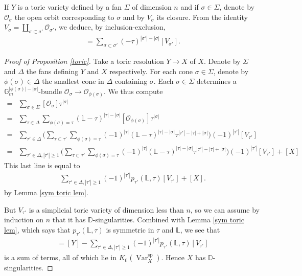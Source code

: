 \documentclass{amsart}
\theoremstyle{definition}
\DeclareMathOperator{\Var}{Var}
\DeclareMathOperator{\spr}{sp}
\newcommand{\KsprX}{K_0(\Var_X^{\spr})}
\numberwithin{equation}{section}
\begin{document}
If $Y$ is a toric variety defined by a fan $\Sigma$ of dimension $n$ and if $\sigma \in \Sigma$, denote by $\mathscr{O}_\sigma$ the open orbit corresponding to $\sigma$ and by $V_\sigma$ its closure. From the identity $V_\sigma = \coprod_{\sigma \subset \sigma'} \mathscr{O}_{\sigma'}$, we deduce, by inclusion-exclusion,
\begin{align*}
    [\mathcal{O}_\sigma] = \sum_{\sigma \subset \sigma'} (-\tau)^{|\sigma'|-|\sigma|} [V_{\sigma'}].
\end{align*}

\begin{proof}[Proof of Proposition \ref{toric}]
Take a toric resolution $Y \rightarrow X$ of $X$. Denote by $\Sigma$ and $\Delta$ the fans defining $Y$ and $X$ respectively. For each cone $\sigma \in \Sigma$, denote by $\phi(\sigma) \in \Delta$ the smallest cone in $\Delta$ containing $\sigma$. Each $\sigma \in \Sigma$ determines a $\mathbb{G}_m^{|\phi(\sigma)|-|\sigma|}$-bundle $\mathcal{O}_\sigma \rightarrow \mathcal{O}_{\phi(\sigma)}$. We thus compute
\begin{align*}
    [Y] =& \sum_{\sigma \in \Sigma} [\mathcal{O}_\sigma] \tau^{|\sigma|} \\
        =& \sum_{\tau \in \Delta} \sum_{\phi(\sigma) = \tau} (\mathbb{L}-\tau)^{|\tau|-|\sigma|} [\mathcal{O}_{\phi(\sigma)}] \tau^{|\sigma|} \\
        =& \sum_{\tau' \in \Delta} \bigg( \sum_{\tau \subset \tau'} \sum_{\phi(\sigma) = \tau } (-1)^{|\tau|} (\mathbb{L}-\tau)^{|\tau|-|\sigma|} \tau^{|\tau'|-|\tau|+|\sigma|} \bigg) (-1)^{|\tau'|} [V_{\tau '}] \\
        =& \sum_{\tau' \in \Delta, |\tau'| \geq 1} \bigg( \sum_{\tau \subset \tau'} \sum_{\phi(\sigma) = \tau} (-1)^{|\tau|} (\mathbb{L}-\tau)^{|\tau|-|\sigma|}  \tau^{|\tau'|-|\tau|+|\sigma|} \bigg) (-1)^{|\tau'|} [V_{\tau'}] + [X] 
\end{align*}
This last line is equal to 
\begin{align*}
    \sum_{\tau' \in \Delta, |\tau'| \geq 1} (-1)^{|\tau'|} p_{\tau'}(\mathbb{L}, \tau) [V_{\tau'}] + [X].
\end{align*}
by Lemma \ref{sym toric lem}.

But $V_{\tau'}$ is a simplicial toric variety of dimension less than $n$, so we can assume by induction on $n$ that it has $\mathbb{D}$-singularities. Combined with Lemma \ref{sym toric lem}, which says that $p_{\tau'}(\mathbb{L}, \tau)$ is symmetric in $\tau$ and $\mathbb{L}$, we see that
\begin{align*}
    [X] = [Y] - \sum_{\tau' \in \Delta, |\tau'| \geq 1} (-1)^{|\tau'|} p_{\tau'}(\mathbb{L}, \tau) [V_{\tau'}]
\end{align*}
is a sum of terms, all of which lie in $\KsprX$. Hence $X$ has $\mathbb{D}$-singularities.
\end{proof}
\end{document}
